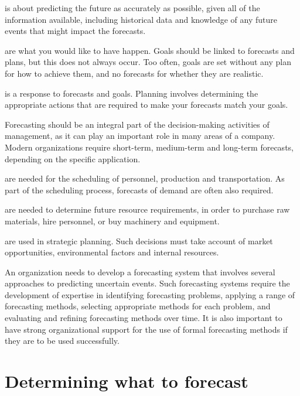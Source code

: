 \documentclass[]{book}
\providecommand{\tightlist}{%
  \setlength{\itemsep}{0pt}\setlength{\parskip}{0pt}}
\begin{document}
\begin{description}
\tightlist
\item[Forecasting]
is about predicting the future as accurately as possible, given all of the information available, including historical data and knowledge of any future events that might impact the forecasts.
\item[Goals]
are what you would like to have happen. Goals should be linked to forecasts and plans, but this does not always occur. Too often, goals are set without any plan for how to achieve them, and no forecasts for whether they are realistic.
\item[Planning]
is a response to forecasts and goals. Planning involves determining the appropriate actions that are required to make your forecasts match your goals.
\end{description}

Forecasting should be an integral part of the decision-making activities of management, as it can play an important role in many areas of a company. Modern organizations require short-term, medium-term and long-term forecasts, depending on the specific application.

\begin{description}
\tightlist
\item[Short-term forecasts]
are needed for the scheduling of personnel, production and transportation. As part of the scheduling process, forecasts of demand are often also required.
\item[Medium-term forecasts]
are needed to determine future resource requirements, in order to purchase raw materials, hire personnel, or buy machinery and equipment.
\item[Long-term forecasts]
are used in strategic planning. Such decisions must take account of market opportunities, environmental factors and internal resources.
\end{description}

An organization needs to develop a forecasting system that involves several approaches to predicting uncertain events. Such forecasting systems require the development of expertise in identifying forecasting problems, applying a range of forecasting methods, selecting appropriate methods for each problem, and evaluating and refining forecasting methods over time. It is also important to have strong organizational support for the use of formal forecasting methods if they are to be used successfully.

\hypertarget{determining-what-to-forecast}{%
\section{Determining what to forecast}\label{determining-what-to-forecast}}
\end{document}
